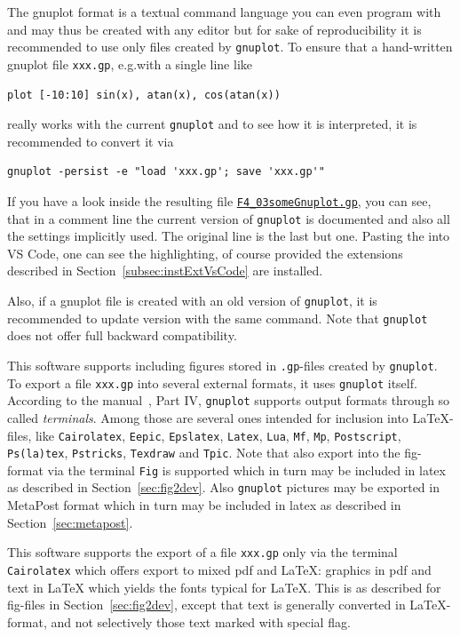 The gnuplot format is a textual command language you can even program with 
and may thus be created with any editor but
for sake of reproducibility it is recommended to use only files
created by \texttt{gnuplot}.
To ensure that a hand-written gnuplot file \texttt{xxx.gp},
e.g.\@ with a single line like
%
\begin{verbatim}
plot [-10:10] sin(x), atan(x), cos(atan(x))
\end{verbatim}
%
really works
with the current \texttt{gnuplot} and to see how it is interpreted,
it is recommended to convert it via
%
\begin{lstlisting}
gnuplot -persist -e "load 'xxx.gp'; save 'xxx.gp'"
\end{lstlisting}
%
If you have a look inside the resulting file 
\href{\urlSite fromTex/F4_03someGnuplot.gp}{\texttt{F4\_03someGnuplot.gp}}, 
you can see, that in a comment line
the current version of \texttt{gnuplot} is documented
and also all the settings implicitly used.
The original line is the last but one. 
Pasting the into VS Code, one can see the highlighting, 
of course provided the extensions 
described in Section~\ref{subsec:instExtVsCode} are installed. 

Also, if a gnuplot file is created with an old version of \texttt{gnuplot},
it is recommended to update version with the same command.
Note that \texttt{gnuplot} does not offer full backward compatibility. 


This software supports including 
figures stored in \texttt{.gp}-files created by \texttt{gnuplot}.
To export a file \texttt{xxx.gp} into several external formats, 
it uses \texttt{gnuplot} itself. 
According to the manual~\cite{GnuPlot}, Part IV, 
\texttt{gnuplot} supports output formats through so called \emph{terminals}. 
Among those are several ones intended for inclusion into \LaTeX-files, 
like \texttt{Cairolatex}, \texttt{Eepic}, \texttt{Epslatex}, 
\texttt{Latex}, \texttt{Lua}, 
\texttt{Mf}, \texttt{Mp}, \texttt{Postscript}, \texttt{Ps(la)tex}, %
\texttt{Pstricks}, \texttt{Texdraw} and \texttt{Tpic}. 
Note that also export into the fig-format via the terminal \texttt{Fig} 
is supported which in turn may be included in latex 
as described in Section~\ref{sec:fig2dev}. 
Also \texttt{gnuplot} pictures may be exported in MetaPost format 
which in turn may be included in latex 
as described in Section~\ref{sec:metapost}. 

This software supports the export of a file \texttt{xxx.gp} 
only via the terminal \texttt{Cairolatex} 
which offers export to mixed pdf and \LaTeX\@: 
graphics in pdf and text in \LaTeX{}
which yields the fonts typical for \LaTeX. 
This is as described for fig-files in Section~\ref{sec:fig2dev}, 
except that text is generally converted in \LaTeX{}-format, 
and not selectively those text marked with special flag. 

